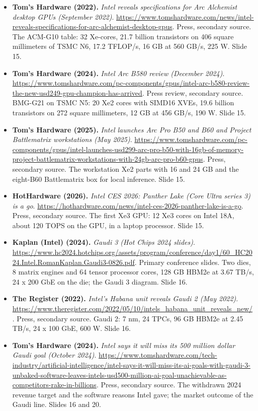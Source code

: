 \begin{itemize}[leftmargin=1.2em,itemsep=3pt]
\item \textbf{Tom's Hardware (2022).} \textit{Intel reveals specifications for Arc Alchemist desktop GPUs (September 2022)}. \url{https://www.tomshardware.com/news/intel-reveals-specifications-for-arc-alchemist-desktop-gpus}. Press, secondary source. The ACM-G10 table: 32 Xe-cores, 21.7 billion transistors on 406 square millimeters of TSMC N6, 17.2 TFLOP/s, 16 GB at 560 GB/s, 225 W. Slide 15.
\item \textbf{Tom's Hardware (2024).} \textit{Intel Arc B580 review (December 2024)}. \url{https://www.tomshardware.com/pc-components/gpus/intel-arc-b580-review-the-new-usd249-gpu-champion-has-arrived}. Press review, secondary source. BMG-G21 on TSMC N5: 20 Xe2 cores with SIMD16 XVEs, 19.6 billion transistors on 272 square millimeters, 12 GB at 456 GB/s, 190 W. Slide 15.
\item \textbf{Tom's Hardware (2025).} \textit{Intel launches Arc Pro B50 and B60 and Project Battlematrix workstations (May 2025)}. \url{https://www.tomshardware.com/pc-components/gpus/intel-launches-usd299-arc-pro-b50-with-16gb-of-memory-project-battlematrix-workstations-with-24gb-arc-pro-b60-gpus}. Press, secondary source. The workstation Xe2 parts with 16 and 24 GB and the eight-B60 Battlematrix box for local inference. Slide 15.
\item \textbf{HotHardware (2026).} \textit{Intel CES 2026: Panther Lake (Core Ultra series 3) is a go}. \url{https://hothardware.com/news/intel-ces-2026-panther-lake-is-a-go}. Press, secondary source. The first Xe3 GPU: 12 Xe3 cores on Intel 18A, about 120 TOPS on the GPU, in a laptop processor. Slide 15.
\item \textbf{Kaplan (Intel) (2024).} \textit{Gaudi 3 (Hot Chips 2024 slides)}. \url{https://www.hc2024.hotchips.org/assets/program/conference/day1/60_HC2024.Intel.RomanKaplan.Gaudi3-0826.pdf}. Primary conference slides. Two dies, 8 matrix engines and 64 tensor processor cores, 128 GB HBM2e at 3.67 TB/s, 24 x 200 GbE on the die; the Gaudi 3 diagram. Slide 16.
\item \textbf{The Register (2022).} \textit{Intel's Habana unit reveals Gaudi 2 (May 2022)}. \url{https://www.theregister.com/2022/05/10/intels_habana_unit_reveals_new/}. Press, secondary source. Gaudi 2: 7 nm, 24 TPCs, 96 GB HBM2e at 2.45 TB/s, 24 x 100 GbE, 600 W. Slide 16.
\item \textbf{Tom's Hardware (2024).} \textit{Intel says it will miss its 500 million dollar Gaudi goal (October 2024)}. \url{https://www.tomshardware.com/tech-industry/artificial-intelligence/intel-says-it-will-miss-its-ai-goals-with-gaudi-3-unbaked-software-leaves-intels-usd500-million-ai-goal-unachievable-as-competitors-rake-in-billions}. Press, secondary source. The withdrawn 2024 revenue target and the software reasons Intel gave; the market outcome of the Gaudi line. Slides 16 and 20.
\end{itemize}
